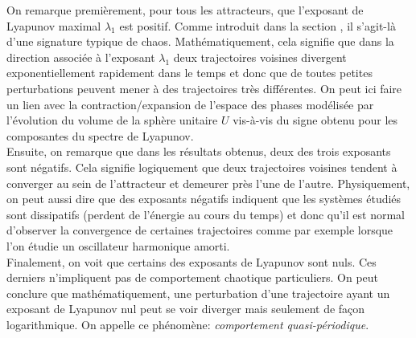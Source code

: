     On remarque premièrement, pour tous les attracteurs, que l'exposant de
    Lyapunov maximal $\lambda_1$ est positif. Comme introduit dans la section
    , il s'agit-là d'une signature typique de chaos.
    Mathématiquement, cela signifie que dans la direction associée à l'exposant
    $\lambda_1$ deux trajectoires voisines divergent exponentiellement
    rapidement dans le temps et donc que de toutes petites perturbations
    peuvent mener à des trajectoires très différentes. On peut ici faire un
    lien avec la contraction/expansion de l'espace des phases modélisée par
    l'évolution du volume de la sphère unitaire $U$ vis-à-vis du signe obtenu
    pour les composantes du spectre de Lyapunov. \\

    Ensuite, on remarque que dans les résultats obtenus, deux des trois
    exposants sont négatifs. Cela signifie logiquement que deux trajectoires
    voisines tendent à converger au sein de l'attracteur et demeurer près l'une
    de l'autre. Physiquement, on peut aussi dire que des exposants négatifs
    indiquent que les systèmes étudiés sont dissipatifs (perdent de l'énergie
    au cours du temps) et donc qu'il est normal d'observer la convergence de
    certaines trajectoires comme par exemple lorsque l'on étudie un oscillateur
    harmonique amorti. \\

    Finalement, on voit que certains des exposants de Lyapunov sont nuls. Ces
    derniers n'impliquent pas de comportement chaotique particuliers. On peut
    conclure que mathématiquement, une perturbation d'une trajectoire ayant un
    exposant de Lyapunov nul peut se voir diverger mais seulement de façon
    logarithmique. On appelle ce phénomène:
    \textit{comportement quasi-périodique}.

\onecolumngrid
\vspace{2cm}

